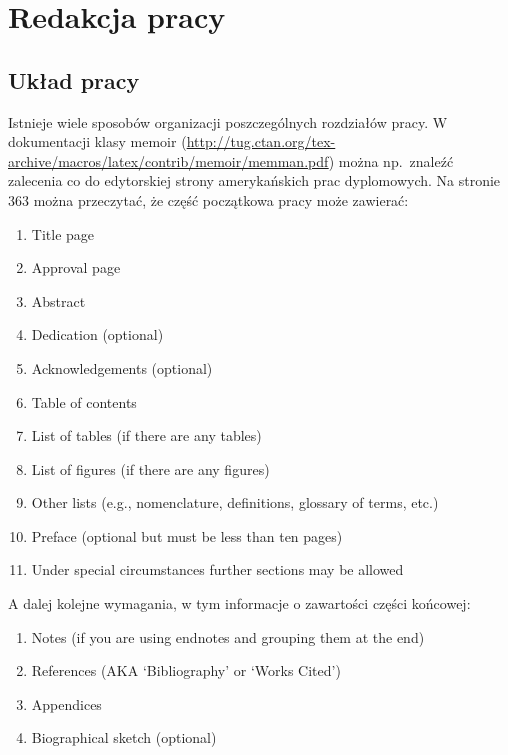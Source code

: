 \chapter{Redakcja pracy}
\section{Układ pracy}
Istnieje wiele sposobów organizacji poszczególnych rozdziałów pracy. W dokumentacji klasy memoir (\url{http://tug.ctan.org/tex-archive/macros/latex/contrib/memoir/memman.pdf}) można np.\ znaleźć zalecenia co do edytorskiej strony amerykańskich prac dyplomowych. Na stronie 363 można przeczytać, że część początkowa pracy może zawierać:
\begin{enumerate}
\item Title page
\item Approval page
\item Abstract
\item Dedication (optional)
\item Acknowledgements (optional)
\item Table of contents
\item List of tables (if there are any tables)
\item List of figures (if there are any figures)
\item Other lists (e.g., nomenclature, definitions, glossary of terms, etc.)
\item Preface (optional but must be less than ten pages)
\item Under special circumstances further sections may be allowed
\end{enumerate}
A dalej kolejne wymagania, w tym informacje o zawartości części końcowej:
\begin{enumerate}
\item Notes (if you are using endnotes and grouping them at the end)
\item References (AKA ‘Bibliography’ or ‘Works Cited’)
\item Appendices
\item Biographical sketch (optional)
\end{enumerate}


